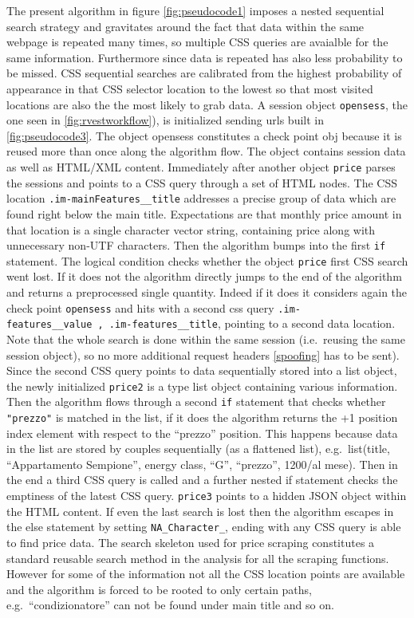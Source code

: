 \documentclass[
  12pt,
  a4paper,
  oneside]{book}
\theoremstyle{definition}
\theoremstyle{definition}
\theoremstyle{definition}
\theoremstyle{remark}
\begin{document}
The present algorithm in figure \ref{fig:pseudocode1} imposes a nested sequential search strategy and gravitates around the fact that data within the same webpage is repeated many times, so multiple CSS queries are avaialble for the same information. Furthermore since data is repeated has also less probability to be missed. CSS sequential searches are calibrated from the highest probability of appearance in that CSS selector location to the lowest so that most visited locations are also the the most likely to grab data.
A session object \texttt{opensess}, the one seen in \ref{fig:rvestworkflow}), is initialized sending urls built in \ref{fig:pseudocode3}. The object opensess constitutes a check point obj because it is reused more than once along the algorithm flow. The object contains session data as well as HTML/XML content. Immediately after another object \texttt{price} parses the sessions and points to a CSS query through a set of HTML nodes. The CSS location \texttt{.im-mainFeatures\_\_title} addresses a precise group of data which are found right below the main title. Expectations are that monthly price amount in that location is a single character vector string, containing price along with unnecessary non-UTF characters. Then the algorithm bumps into the first \texttt{if} statement. The logical condition checks whether the object \texttt{price} first CSS search went lost. If it does not the algorithm directly jumps to the end of the algorithm and returns a preprocessed single quantity. Indeed if it does it considers again the check point \texttt{opensess} and hits with a second css query \texttt{.im-features\_\_value\ ,\ .im-features\_\_title}, pointing to a second data location. Note that the whole search is done within the same session (i.e.~reusing the same session object), so no more additional request headers \ref{spoofing} has to be sent). Since the second CSS query points to data sequentially stored into a list object, the newly initialized \texttt{price2} is a type list object containing various information. Then the algorithm flows through a second \texttt{if} statement that checks whether \texttt{"prezzo"} is matched in the list, if it does the algorithm returns the +1 position index element with respect to the ``prezzo'' position. This happens because data in the list are stored by couples sequentially (as a flattened list), e.g.~list(title, ``Appartamento Sempione'', energy class, ``G'', ``prezzo'', 1200/al mese). Then in the end a third CSS query is called and a further nested if statement checks the emptiness of the latest CSS query. \texttt{price3} points to a hidden JSON object within the HTML content. If even the last search is lost then the algorithm escapes in the else statement by setting \texttt{NA\_Character\_}, ending with any CSS query is able to find price data.
The search skeleton used for price scraping constitutes a standard reusable search method in the analysis for all the scraping functions. However for some of the information not all the CSS location points are available and the algorithm is forced to be rooted to only certain paths, e.g.~``condizionatore'' can not be found under main title and so on.
\end{document}
